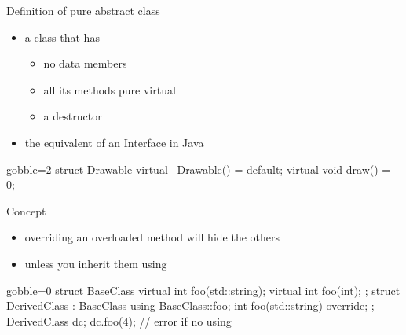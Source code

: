 \begin{frame}[fragile]
  \begin{block}{Definition of pure abstract class}
    \begin{itemize}
    \item a class that has
      \begin{itemize}
        \item no data members
        \item all its methods pure virtual
        \item a  destructor
      \end{itemize}
    \item the equivalent of an Interface in Java
    \end{itemize}
  \end{block}
  \begin{multicols}{2}
    \begin{cppcode*}{gobble=2}
      struct Drawable {
        virtual ~Drawable()
                      = default;
        virtual void draw() = 0;
      }
    \end{cppcode*}
    \columnbreak
    \center
  \end{multicols}
\end{frame}

\begin{frame}[fragile]
  \begin{block}{Concept}
    \begin{itemize}
    \item overriding an overloaded method will hide the others
    \item unless you inherit them using 
    \end{itemize}
  \end{block}
  \begin{cppcode*}{gobble=0}
    struct BaseClass {
      virtual int foo(std::string);
      virtual int foo(int);
    };
    struct DerivedClass : BaseClass {
      using BaseClass::foo;
      int foo(std::string) override;
    };
    DerivedClass dc;
    dc.foo(4);      // error if no using
    \end{cppcode*}
\end{frame}

